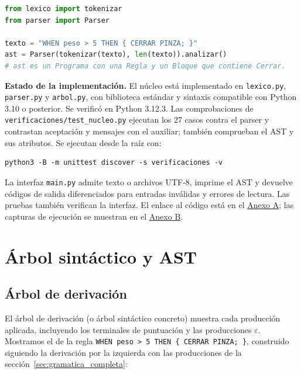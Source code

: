 \documentclass[10pt,a4paper]{article}
\newcommand{\tm}[1]{\texttt{#1}}                                          %
\begin{document}
\begin{lstlisting}[language=Python]
from lexico import tokenizar
from parser import Parser

texto = "WHEN peso > 5 THEN { CERRAR PINZA; }"
ast = Parser(tokenizar(texto), len(texto)).analizar()
# ast es un Programa con una Regla y un Bloque que contiene Cerrar.
\end{lstlisting}

\textbf{Estado de la implementación.} El núcleo está implementado en \tm{lexico.py}, \tm{parser.py} y \tm{arbol.py}, con biblioteca estándar y sintaxis compatible con Python 3.10 o posterior. Se verificó en Python 3.12.3. Las comprobaciones de \tm{verificaciones/test\_nucleo.py} ejecutan los 27 casos contra el parser y contrastan aceptación y mensajes con el auxiliar; también comprueban el AST y sus atributos. Se ejecutan desde la raíz con:
\begin{lstlisting}
python3 -B -m unittest discover -s verificaciones -v
\end{lstlisting}
La interfaz \tm{main.py} admite texto o archivos UTF-8, imprime el AST y devuelve códigos de salida diferenciados para entradas inválidas y errores de lectura. Las pruebas también verifican la interfaz. El enlace al código está en el \hyperlink{anexoA}{Anexo A}; las capturas de ejecución se muestran en el \hyperlink{anexoB}{Anexo B}.

\section{Árbol sintáctico y AST}
\label{sec:ast}

\subsection{Árbol de derivación}

El árbol de derivación (o árbol sintáctico concreto) muestra cada producción aplicada, incluyendo los terminales de
puntuación y las producciones $\varepsilon$. Mostramos el de la regla \tm{WHEN peso > 5 THEN \{ CERRAR PINZA; \}},
construido siguiendo la derivación por la izquierda con las producciones de la sección~\ref{sec:gramatica_completa}:
\end{document}
